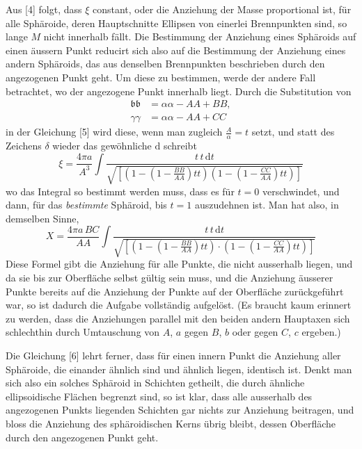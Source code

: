 \documentclass[11pt,a4paper]{article}
\begin{document}
Aus [4] folgt, dass $\xi$ constant, oder die Anziehung der Masse proportional ist, für alle Sphäroide, deren Hauptschnitte Ellipsen von einerlei Brennpunkten sind, so lange $M$ nicht innerhalb fällt. Die Bestimmung der Anziehung eines Sphäroids auf einen äussern Punkt reducirt sich also auf die Bestimmung der Anziehung eines andern Sphäroids, das aus denselben Brennpunkten beschrieben durch den angezogenen Punkt geht. Um diese zu bestimmen, werde der andere Fall betrachtet, wo der angezogene Punkt innerhalb liegt. Durch die Substitution von
\begin{align*}
\mathfrak{b}\mathfrak{b} &= \alpha\alpha - AA + BB, \\
\gamma\gamma &= \alpha\alpha - AA + CC
\end{align*}
in der Gleichung [5] wird diese, wenn man zugleich $\frac{A}{\alpha} = t$ setzt, und statt des Zeichens $\delta$ wieder das gewöhnliche $\mathrm{d}$ schreibt
\[
\xi = \frac{4\pi a}{A^3} \int \frac{t\,t\,\mathrm{d}t}{\sqrt{[(1 - (1 - \frac{BB}{AA})tt)(1 - (1 - \frac{CC}{AA})tt)]}}
\]
wo das Integral so bestimmt werden muss, dass es für $t = 0$ verschwindet, und dann, für das \textit{bestimmte} Sphäroid, bis $t = 1$ auszudehnen ist. Man hat also, in demselben Sinne,
\[
\tag{[6]} X = \frac{4\pi a\,BC}{AA} \int \frac{t\,t\,\mathrm{d}t}{\sqrt{[(1 - (1 - \frac{BB}{AA})tt) \cdot (1 - (1 - \frac{CC}{AA})tt)]}}
\]
Diese Formel gibt die Anziehung für alle Punkte, die nicht ausserhalb liegen, und da sie bis zur Oberfläche selbst gültig sein muss, und die Anziehung äusserer Punkte bereits auf die Anziehung der Punkte auf der Oberfläche zurückgeführt war, so ist dadurch die Aufgabe vollständig aufgelöst. (Es braucht kaum erinnert zu werden, dass die Anziehungen parallel mit den beiden andern Hauptaxen sich schlechthin durch Umtauschung von $A$, $a$ gegen $B$, $b$ oder gegen $C$, $c$ ergeben.)

Die Gleichung [6] lehrt ferner, dass für einen innern Punkt die Anziehung aller Sphäroide, die einander ähnlich sind und ähnlich liegen, identisch ist. Denkt man sich also ein solches Sphäroid in Schichten getheilt, die durch ähnliche ellipsoidische Flächen begrenzt sind, so ist klar, dass alle ausserhalb des angezogenen Punkts liegenden Schichten gar nichts zur Anziehung beitragen, und bloss die Anziehung des sphäroidischen Kerns übrig bleibt, dessen Oberfläche durch den angezogenen Punkt geht.
\end{document}
